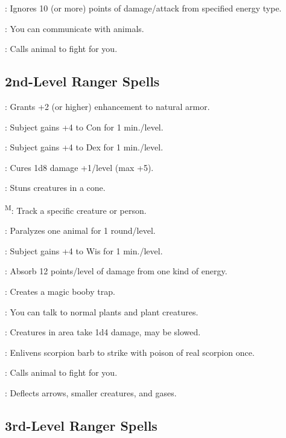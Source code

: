 : Ignores 10 (or more) points of damage/attack from specified energy type.

: You can communicate with animals.

: Calls animal to fight for you.



\subsection{2nd-Level Ranger Spells}

: Grants +2 (or higher) enhancement to natural armor.

: Subject gains +4 to Con for 1 min./level.

: Subject gains +4 to Dex for 1 min./level.

: Cures 1d8 damage +1/level (max +5).

: Stuns creatures in a cone. %

\textsuperscript{M}: Track a specific creature or person. %

: Paralyzes one animal for 1 round/level.

: Subject gains +4 to Wis for 1 min./level.

: Absorb 12 points/level of damage from one kind of energy.

: Creates a magic booby trap.

: You can talk to normal plants and plant creatures.

: Creatures in area take 1d4 damage, may be slowed.

: Enlivens scorpion barb to strike with poison of real scorpion once. %

: Calls animal to fight for you.

: Deflects arrows, smaller creatures, and gases.



\subsection{3rd-Level Ranger Spells}


